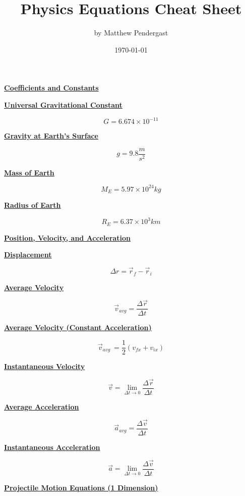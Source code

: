 \documentclass[12pt, letterpaper]{article}
\title{\textbf{Physics Equations Cheat Sheet}}
\author{by Matthew Pendergast}
\date{\today}
\begin{document}
\maketitle

\noindent\makebox[\linewidth]{\rule{\paperwidth}{0.4pt}}
\vspace{1em}


\Large{\centerline{\textbf{\underline{Coefficients and Constants}}}}
\vspace{1em}

\normalsize{\centerline{\textbf{\underline{Universal Gravitational Constant}}}}
\[G = 6.674 \times 10^{-11}\]

\normalsize{\centerline{\textbf{\underline{Gravity at Earth's Surface}}}}
\[g = 9.8 \frac{m}{s^2}\]

\normalsize{\centerline{\textbf{\underline{Mass of Earth}}}}
\[M_E = 5.97 \times 10^{24} kg\]

\normalsize{\centerline{\textbf{\underline{Radius of Earth}}}}
\[R_E = 6.37 \times 10^3 km\]

\newpage

\Large{\centerline{\textbf{\underline{Position, Velocity, and Acceleration}}}}
\vspace{1em}

\normalsize{\centerline{\textbf{\underline{Displacement}}}}
\[\Delta r = \vec{r}_f - \vec{r}_i\]

\centerline{\textbf{\underline{Average Velocity}}}
\[\vec{v}_{avg} = \frac{\Delta \vec{r}}{\Delta t}\]

\centerline{\textbf{\underline{Average Velocity (Constant Acceleration)}}}
\[\vec{v}_{avg}\ = \frac{1}{2} (v_{fx} + v_{ix})\]

\centerline{\textbf{\underline{Instantaneous Velocity}}}
\[\vec{v} = \lim_{\Delta t \to 0} \frac{\Delta \vec{r}}{\Delta t}\]

\centerline{\textbf{\underline{Average Acceleration}}}
\[\vec{a}_{avg} = \frac{\Delta \vec{v}}{\Delta t}\]

\centerline{\textbf{\underline{Instantaneous Acceleration}}}
\[\vec{a} = \lim_{\Delta t \to 0} \frac{\Delta \vec{v}}{\Delta t}\]

\newpage

\Large{\centerline{\textbf{\underline{Projectile Motion Equations (1 Dimension)}}}}
\vspace{1em}
\end{document}
